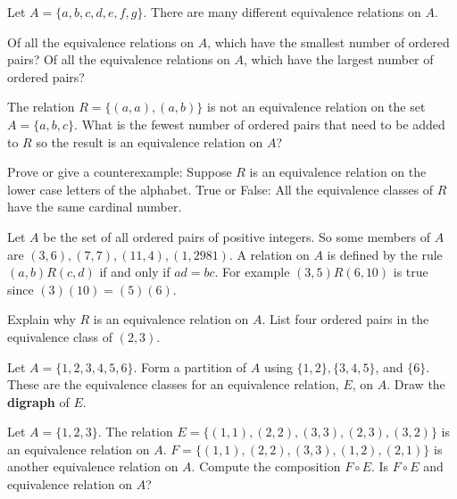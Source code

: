 \begin{prob}
Let $A = \{ a,b,c,d,e,f,g\}$. There are many different equivalence relations on $A$.
  \begin{tasks}
    \task Of all the equivalence relations on $A$, which have the smallest number of ordered pairs?
    \task Of all the equivalence relations on $A$, which have the  largest number of ordered pairs?
  \end{tasks}
\end{prob}

\begin{prob}
The relation $R = \{ (a,a), (a,b)\}$ is not an equivalence relation on the set $A = \{ a,b,c\}$. What is the fewest number of ordered pairs that need to be added to $R$ so the result is an equivalence relation on $A$?
\end{prob}

\begin{prob}
 Prove or give a counterexample: Suppose $R$ is an equivalence relation on the lower case letters of the alphabet. True or False: All the equivalence classes of $R$ have the same cardinal number. 
\end{prob}

\begin{prob}
Let $A$ be the set of all ordered pairs of positive integers.
So some members of $A$ are $(3,6),  (7,7), (11,4), (1,2981)$. A relation on $A$ is defined by the rule 
$(a,b) R (c,d)$ if and only if $ad = bc$. For example $(3,5) R (6,10)$ is true since $(3)(10)=(5)(6)$.\\[3pt]
  \begin{tasks}
     \task Explain why $R$ is an equivalence relation on $A$.
     \task List four ordered pairs in the equivalence class of $(2,3)$.
  \end{tasks}
\end{prob}

\begin{prob}   
Let $A=\{1,2,3,4,5,6\}$. 
Form a partition of $A$ using $\{1, 2\}, \{3, 4, 5\}$, and $\{6\}$.
These are the equivalence classes for an equivalence relation, $E$, on $A$.
 Draw the  {\bf digraph} of $E$.
 \end{prob}

\begin{prob}
Let $A = \{ 1,2,3\}$. The relation $E = \{ (1,1),(2,2),(3,3),(2,3),(3,2)\}$ is an
equivalence relation on $A$.  $F=\{ (1,1),(2,2),(3,3),(1,2),(2,1)\}$ 
is another equivalence relation on $A$. Compute the composition $F\circ E$.
Is $F\circ E$ and equivalence relation on $A$?
\end{prob}



